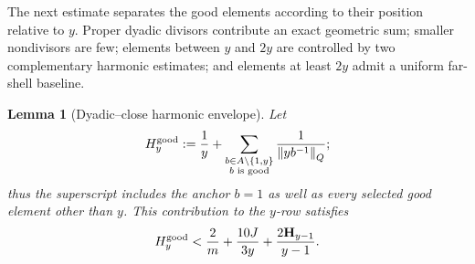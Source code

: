 \documentclass[11pt]{article}
\newtheorem{lemma}[theorem]{Lemma}
\theoremstyle{definition}
\theoremstyle{remark}
\newcommand{\normQ}[1]{\left\lVert #1\right\rVert_Q}
\newcommand{\Harm}{\mathbf H}
\begin{document}
The next estimate separates the good elements according to their position
relative to \(y\).  Proper dyadic divisors contribute an exact geometric
sum; smaller nondivisors are few; elements between \(y\) and \(2y\) are
controlled by two complementary harmonic estimates; and elements at least
\(2y\) admit a uniform far-shell baseline.

\begin{lemma}[Dyadic--close harmonic envelope]\label{lem:dyadic-close}
Let
\[
 H_y^{\rm good}:=\frac1y+
 \sum_{\substack{b\in A\setminus\{1,y\}\\ b\text{ is good}}}
 \frac1{\normQ{yb^{-1}}};
\]
thus the superscript includes the anchor \(b=1\) as well as every selected
good element other than \(y\).  This contribution to the \(y\)-row satisfies
\begin{equation}\label{eq:dyadic-close}
 H_y^{\rm good}
 <\frac2m+\frac{10J}{3y}+\frac{2\Harm_{y-1}}{y-1}.
\end{equation}
\end{lemma}
\end{document}
